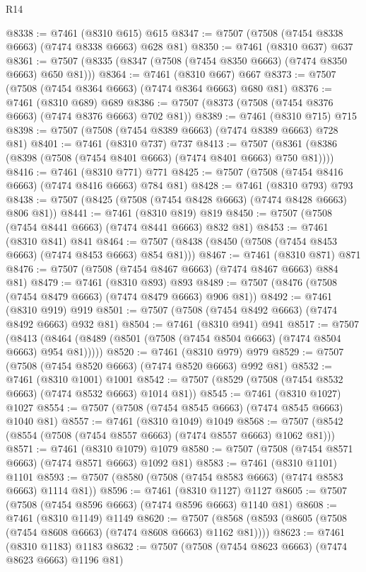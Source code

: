 \begin{lexlean}{R14}
\begin{coremodule}
{{{{{{{{{{{{{{{{{{{{{{{{{{{{{{{{{{{{{{{{{{{{{{{{{{{{{{{{{{{{{{{{{{{{{{{{{{{{{{{{{{@8338 := @7461 (@8310 @615) @615
@8347 := @7507 (@7508 (@7454 @8338 @6663) (@7474 @8338 @6663) @628 @81)
@8350 := @7461 (@8310 @637) @637
@8361 := @7507 (@8335 (@8347 (@7508 (@7454 @8350 @6663) (@7474 @8350 @6663) @650 @81)))
@8364 := @7461 (@8310 @667) @667
@8373 := @7507 (@7508 (@7454 @8364 @6663) (@7474 @8364 @6663) @680 @81)
@8376 := @7461 (@8310 @689) @689
@8386 := @7507 (@8373 (@7508 (@7454 @8376 @6663) (@7474 @8376 @6663) @702 @81))
@8389 := @7461 (@8310 @715) @715
@8398 := @7507 (@7508 (@7454 @8389 @6663) (@7474 @8389 @6663) @728 @81)
@8401 := @7461 (@8310 @737) @737
@8413 := @7507 (@8361 (@8386 (@8398 (@7508 (@7454 @8401 @6663) (@7474 @8401 @6663) @750 @81))))
@8416 := @7461 (@8310 @771) @771
@8425 := @7507 (@7508 (@7454 @8416 @6663) (@7474 @8416 @6663) @784 @81)
@8428 := @7461 (@8310 @793) @793
@8438 := @7507 (@8425 (@7508 (@7454 @8428 @6663) (@7474 @8428 @6663) @806 @81))
@8441 := @7461 (@8310 @819) @819
@8450 := @7507 (@7508 (@7454 @8441 @6663) (@7474 @8441 @6663) @832 @81)
@8453 := @7461 (@8310 @841) @841
@8464 := @7507 (@8438 (@8450 (@7508 (@7454 @8453 @6663) (@7474 @8453 @6663) @854 @81)))
@8467 := @7461 (@8310 @871) @871
@8476 := @7507 (@7508 (@7454 @8467 @6663) (@7474 @8467 @6663) @884 @81)
@8479 := @7461 (@8310 @893) @893
@8489 := @7507 (@8476 (@7508 (@7454 @8479 @6663) (@7474 @8479 @6663) @906 @81))
@8492 := @7461 (@8310 @919) @919
@8501 := @7507 (@7508 (@7454 @8492 @6663) (@7474 @8492 @6663) @932 @81)
@8504 := @7461 (@8310 @941) @941
@8517 := @7507
    (@8413 (@8464 (@8489 (@8501 (@7508 (@7454 @8504 @6663) (@7474 @8504 @6663) @954 @81)))))
@8520 := @7461 (@8310 @979) @979
@8529 := @7507 (@7508 (@7454 @8520 @6663) (@7474 @8520 @6663) @992 @81)
@8532 := @7461 (@8310 @1001) @1001
@8542 := @7507 (@8529 (@7508 (@7454 @8532 @6663) (@7474 @8532 @6663) @1014 @81))
@8545 := @7461 (@8310 @1027) @1027
@8554 := @7507 (@7508 (@7454 @8545 @6663) (@7474 @8545 @6663) @1040 @81)
@8557 := @7461 (@8310 @1049) @1049
@8568 := @7507 (@8542 (@8554 (@7508 (@7454 @8557 @6663) (@7474 @8557 @6663) @1062 @81)))
@8571 := @7461 (@8310 @1079) @1079
@8580 := @7507 (@7508 (@7454 @8571 @6663) (@7474 @8571 @6663) @1092 @81)
@8583 := @7461 (@8310 @1101) @1101
@8593 := @7507 (@8580 (@7508 (@7454 @8583 @6663) (@7474 @8583 @6663) @1114 @81))
@8596 := @7461 (@8310 @1127) @1127
@8605 := @7507 (@7508 (@7454 @8596 @6663) (@7474 @8596 @6663) @1140 @81)
@8608 := @7461 (@8310 @1149) @1149
@8620 := @7507 (@8568 (@8593 (@8605 (@7508 (@7454 @8608 @6663) (@7474 @8608 @6663) @1162 @81))))
@8623 := @7461 (@8310 @1183) @1183
@8632 := @7507 (@7508 (@7454 @8623 @6663) (@7474 @8623 @6663) @1196 @81)
}}}}}}}}}}}}}}}}}}}}}}}}}}}}}}}}}}}}}}}}}}}}}}}}}}}}}}}}}}}}}}}}}}}}}}}}}}}}}}}}}}
\end{coremodule}
\end{lexlean}
